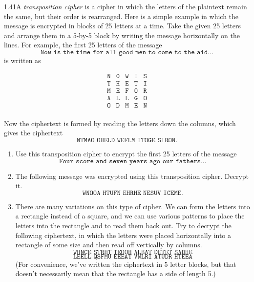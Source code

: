\begin{exercise}
    {1.41}A \textit{transposition cipher} is a cipher in which the letters of the plaintext remain the same, but their order is rearranged. Here is a simple example in which the message is encrypted in blocks of 25 letters at a time. Take the given 25 letters and arrange them in a 5-by-5 block by writing the message horizontally on the lines. For example, the first 25 letters of the message
    \[\texttt{Now is the time for all good men to come to the aid...} \]
    is written as
    \begin{center}
        \vspace*{-1cm}
        \[
            \begin{array}{ccccc}
                \texttt{N} & \texttt{0} & \texttt{W} & \texttt{I} & \texttt{S} \\
                \texttt{T} & \texttt{H} & \texttt{E} & \texttt{T} & \texttt{I} \\
                \texttt{M} & \texttt{E} & \texttt{F} & \texttt{O} & \texttt{R} \\
                \texttt{A} & \texttt{L} & \texttt{L} & \texttt{G} & \texttt{O} \\
                \texttt{O} & \texttt{D} & \texttt{M} & \texttt{E} & \texttt{N} \\
            \end{array}
        \]
    \end{center}
    Now the ciphertext is formed by reading the letters down the columns, which gives the ciphertext
    \[\texttt{NTMAO OHELD WEFLM ITOGE SIRON.}\]
    \begin{enumerate}
        \item Use this transposition cipher to encrypt the first 25 letters of the message
              \[\texttt{Four score and seven years ago our fathers...}\]
        \item The following message was encrypted using this transposition cipher. Decrypt it.
              \[\texttt{WNOOA HTUFN EHRHE NESUV ICEME.}\]
        \item There are many variations on this type of cipher. We can form the letters into a rectangle instead of a square, and we can use various patterns to place the letters into the rectangle and to read them back out. Try to decrypt the following  ciphertext, in which the letters were placed horizontally into a rectangle of some size and then read off vertically by columns.
              \[\texttt{WHNCE STRHT TEOOH ALBAT DETET SADHE}\]
              \vspace*{-1cm}
              \[\texttt{LEELL QSFMU EEEAT VNLRI ATUDR HTEEA}\]
              (For convenience, we’ve written the ciphertext in 5 letter blocks, but that doesn’t necessarily mean that the rectangle has a side of length 5.)
    \end{enumerate}
\end{exercise}

